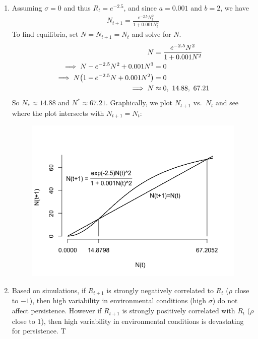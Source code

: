 \documentclass{article} %
\theoremstyle{plain}
\numberwithin{equation}{section} %
\numberwithin{figure}{section} %
\numberwithin{table}{section} %
\begin{document}
\begin{enumerate}[\ \ (a)]
    \item
        Assuming $\sigma = 0$ and thus $R_t = e^{-2.5}$, and since $a = 0.001$ and $b = 2$, we have
        \begin{align*}
            N_{t+1} = \frac{e^{-2.5} N_t^2}{1 + 0.001N_t^2}
        \end{align*}
        To find equilibria, set $N = N_{t+1} = N_t$ and solve for $N$.
        \begin{align*}
            N &= \frac{e^{-2.5}N^2}{1 + 0.001N^2} \\
            \implies N - e^{-2.5}N^2 + 0.001N^3 &= 0 \\
            \implies N\qty(1 - e^{-2.5}N + 0.001N^2) &= 0 \\
            \implies N &\approx 0,\ 14.88,\ 67.21
        \end{align*}
        So $N_* \approx 14.88$ and $N^* \approx 67.21$.  Graphically, we plot $N_{t+1}$ vs.~$N_t$ and see where the plot intersects with $N_{t+1} = N_{t}$:
        \begin{figure}[ht!]
            \centering
            \includegraphics[scale=0.5]{figure_3a.png}
        \end{figure}
        \FloatBarrier
    \item
        Based on simulations, if $R_{t+1}$ is strongly negatively correlated to $R_t$ ($\rho$ close to $-1$), then high variability in environmental conditions (high $\sigma$) do not affect persistence.  However if $R_{t+1}$ is strongly positively correlated with $R_t$ ($\rho$ close to $1$), then high variability in environmental conditions is devastating for persistence. T

\end{enumerate}
\end{document}
